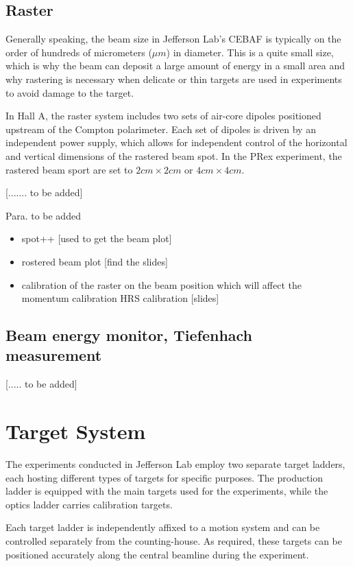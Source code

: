 \subsection{Raster}

Generally speaking, the beam size in Jefferson Lab's CEBAF is typically on the order of hundreds of micrometers (${\mu}m$) in diameter. This is a quite small size, which is why the beam can deposit a large amount of energy in a small area and why rastering is necessary when delicate or thin targets are used in experiments to avoid damage to the target.

In Hall A, the raster system includes two sets of air-core dipoles positioned upstream of the Compton polarimeter. Each set of dipoles is driven by an independent power supply, which allows for independent control of the horizontal and vertical dimensions of the rastered beam spot. In the PRex experiment, the rastered beam sport are set to $2cm \times 2 cm$ or $4cm \times 4cm$.

[....... to be added]

Para. to be added
\begin{itemize}
    \item spot++ [used to get the beam plot]
    \item rostered beam plot [find the slides]
    \item calibration of the raster on the beam position which will affect the momentum calibration HRS calibration [slides]
\end{itemize}

\subsection{Beam energy monitor, Tiefenhach measurement}

[..... to be added]

\section{Target System}

The experiments conducted in Jefferson Lab employ two separate target ladders, each hosting different types of targets for specific purposes. The production ladder is equipped with the main targets used for the experiments, while the optics ladder carries calibration targets.

Each target ladder is independently affixed to a motion system and can be controlled separately from the counting-house. As required, these targets can be positioned accurately along the central beamline during the experiment.

